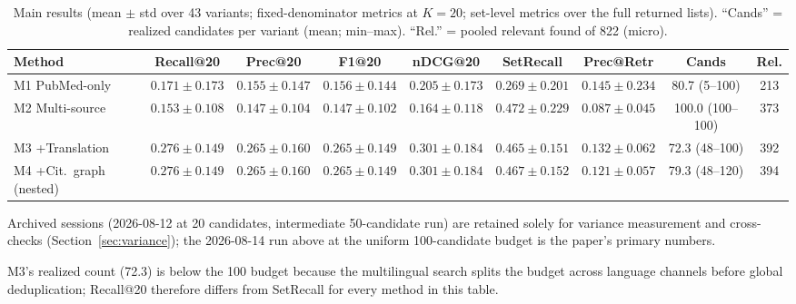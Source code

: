 \documentclass[sigconf,screen]{acmart}
\begin{document}
\begin{table}[t]
\centering
\small
\begin{threeparttable}
\caption{Main results (mean $\pm$ std over 43 variants; fixed-denominator
metrics at $K{=}20$; set-level metrics over the full returned lists).
``Cands'' = realized candidates per variant (mean; min--max). ``Rel.''
= pooled relevant found of 822 (micro).}
\label{tab:main}
\footnotesize
\setlength{\tabcolsep}{4.5pt}
\begin{tabular}{@{}lcccccccc@{}}
\toprule
Method & Recall@20 & Prec@20 & F1@20 & nDCG@20 & SetRecall & Prec@Retr & Cands & Rel. \\
\midrule
M1 PubMed-only & $0.171\pm0.173$ & $0.155\pm0.147$ & $0.156\pm0.144$ & $0.205\pm0.173$ & $0.269\pm0.201$ & $0.145\pm0.234$ & 80.7 (5--100) & 213 \\
M2 Multi-source & $0.153\pm0.108$ & $0.147\pm0.104$ & $0.147\pm0.102$ & $0.164\pm0.118$ & $0.472\pm0.229$ & $0.087\pm0.045$ & 100.0 (100--100) & 373 \\
M3 +Translation & $0.276\pm0.149$ & $0.265\pm0.160$ & $0.265\pm0.149$ & $0.301\pm0.184$ & $0.465\pm0.151$ & $0.132\pm0.062$ & 72.3 (48--100) & 392 \\
M4 +Cit.\ graph (nested) & $0.276\pm0.149$ & $0.265\pm0.160$ & $0.265\pm0.149$ & $0.301\pm0.184$ & $0.467\pm0.152$ & $0.121\pm0.057$ & 79.3 (48--120) & 394 \\
\bottomrule
\end{tabular}
\begin{tablenotes}
\item Archived sessions (2026-08-12 at 20 candidates, intermediate
50-candidate run) are retained solely for variance measurement and
cross-checks (Section~\ref{sec:variance}); the 2026-08-14 run above at the
uniform 100-candidate budget is the paper's primary numbers.
\item M3's realized count (72.3) is below the 100 budget because the
multilingual search splits the budget across language channels before
global deduplication; Recall@20 therefore differs from SetRecall for
every method in this table.
\end{tablenotes}
\end{threeparttable}
\end{table}
\end{document}
